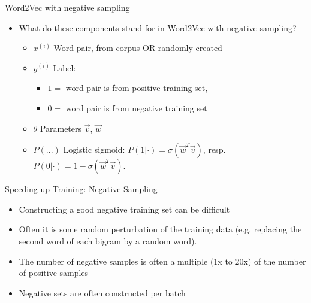
\begin{vbframe}{Word2Vec with negative sampling}

\vfill

\begin{itemize}
	\item \ques What do these components stand for in Word2Vec with negative sampling?
		\begin{itemize}
			\item $x^{(i)}$ Word pair, from corpus OR randomly created
			\item $y^{(i)}$ Label: 
					\begin{itemize}
						\item $1 = $ word pair is from positive training set,
						\item $0 = $ word pair is from negative training set
					\end{itemize} 
			\item $\theta$ Parameters $\vec v$, $\vec w$
			\item $P(...)$ Logistic sigmoid: $P(1|\cdot) = \sigma(\vec w^T \vec v)$, resp. $P(0|\cdot) = 1-\sigma(\vec w^T \vec v)$.
		\end{itemize}
\end{itemize}

\vfill

\end{vbframe}


\begin{vbframe}{Speeding up Training: Negative Sampling}

\vfill

\begin{itemize}
	\item Constructing a good negative training set can be difficult
	\item Often it is some random perturbation of the training data (e.g. replacing the second word of each bigram by a random word).
	\item The number of negative samples is often a multiple (1x to 20x) of the number of positive samples
	\item Negative sets are often constructed per batch
\end{itemize}

\vfill

\end{vbframe}

